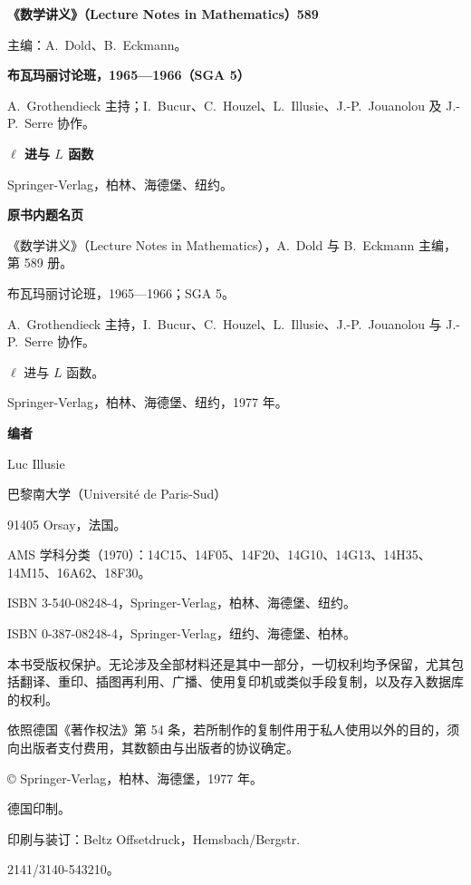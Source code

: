 \textbf{《数学讲义》（Lecture Notes in Mathematics）589}\par
主编：A.~Dold、B.~Eckmann。\par
\textbf{布瓦玛丽讨论班，1965—1966（SGA 5）}\par
A.~Grothendieck 主持；I.~Bucur、C.~Houzel、L.~Illusie、J.-P.~Jouanolou 及 J.-P.~Serre 协作。\par
\textbf{$\ell$ 进与 $L$ 函数}\par
Springer-Verlag，柏林、海德堡、纽约。

\textbf{原书内题名页}\par
《数学讲义》（Lecture Notes in Mathematics），A.~Dold 与 B.~Eckmann 主编，第 589 册。\par
布瓦玛丽讨论班，1965—1966；SGA 5。\par
A.~Grothendieck 主持，I.~Bucur、C.~Houzel、L.~Illusie、J.-P.~Jouanolou 与 J.-P.~Serre 协作。\par
$\ell$ 进与 $L$ 函数。\par
Springer-Verlag，柏林、海德堡、纽约，1977 年。

\textbf{编者}\par
Luc Illusie\par
巴黎南大学（Université de Paris-Sud）\par
91405 Orsay，法国。\par
\medskip
AMS 学科分类（1970）：14C15、14F05、14F20、14G10、14G13、14H35、14M15、16A62、18F30。\par
ISBN 3-540-08248-4，Springer-Verlag，柏林、海德堡、纽约。\par
ISBN 0-387-08248-4，Springer-Verlag，纽约、海德堡、柏林。\par
\medskip
本书受版权保护。无论涉及全部材料还是其中一部分，一切权利均予保留，尤其包括翻译、重印、插图再利用、广播、使用复印机或类似手段复制，以及存入数据库的权利。

依照德国《著作权法》第 54 条，若所制作的复制件用于私人使用以外的目的，须向出版者支付费用，其数额由与出版者的协议确定。\par
\copyright{} Springer-Verlag，柏林、海德堡，1977 年。\par
德国印制。\par
印刷与装订：Beltz Offsetdruck，Hemsbach/Bergstr.\par
2141/3140-543210。

